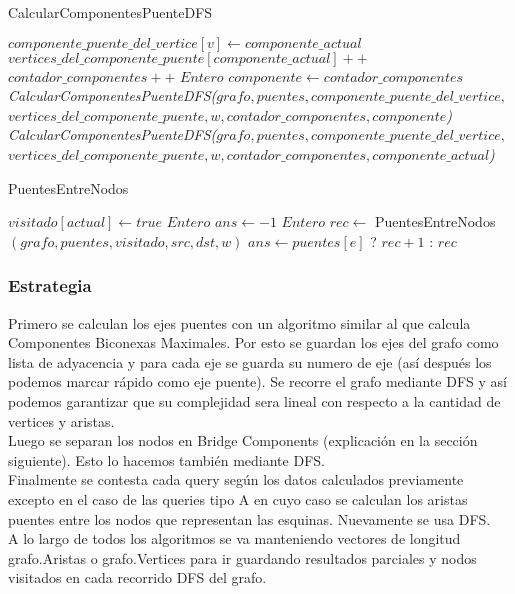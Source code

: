 \begin{algorithm}[]
    \caption{CalcularComponentesPuenteDFS}
    $componente\_puente\_del\_vertice[v] \gets componente\_actual$ \;
    $vertices\_del\_componente\_puente[componente\_actual]++$ \;
     {
    	 {
			 {
				$contador\_componentes++$ \;
				$Entero$ $componente \gets contador\_componentes$ \;
				\emph{CalcularComponentesPuenteDFS($grafo, puentes, componente\_puente\_del\_vertice,$ 
				$vertices\_del\_componente\_puente, w, contador\_componentes, componente$)} \;
			}{
				\emph{CalcularComponentesPuenteDFS($grafo, puentes, componente\_puente\_del\_vertice,$ 
				$vertices\_del\_componente\_puente, w, contador\_componentes, componente\_actual$)}
			}
		}
    }
\end{algorithm}

\begin{algorithm}[H]
    \caption{PuentesEntreNodos}
    $visitado[actual] \gets true$ \;
     {
    }
    $Entero$ $ans \gets -1$ \;
     {
    	 {
			$Entero$ $rec \gets$ PuentesEntreNodos$(grafo, puentes, visitado, src, dst, w)$ \;
			 {
				$ans \gets puentes[e]$ ? $rec+1$ : $rec$
			}
		}
    }
\end{algorithm}

\subsubsection*{Estrategia}

Primero se calculan los ejes puentes con un algoritmo similar al que calcula Componentes Biconexas Maximales. Por esto
se guardan los ejes del grafo como lista de adyacencia y para cada eje se guarda su numero de eje (as\'i despu\'es los podemos
marcar rápido como eje puente). Se recorre el grafo mediante DFS y as\'i podemos garantizar que su complejidad sera lineal 
con respecto a la cantidad de vertices y aristas. \\
Luego se separan los nodos en Bridge Components (explicación en la secci\'on siguiente). Esto lo hacemos tambi\'en mediante DFS. \\
Finalmente se contesta cada query seg\'un los datos calculados previamente excepto en el caso de las queries tipo A en cuyo caso 
se calculan los aristas puentes entre los nodos que representan las esquinas. Nuevamente se usa DFS. \\
A lo largo de todos los algoritmos se va manteniendo vectores de longitud grafo.Aristas o grafo.Vertices para ir guardando resultados
parciales y nodos visitados en cada recorrido DFS del grafo. \\

